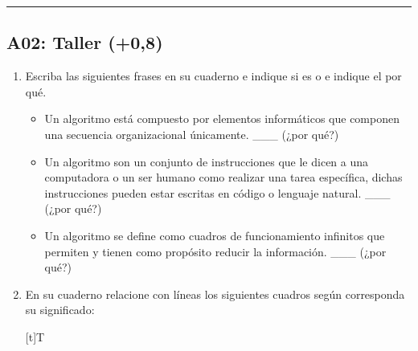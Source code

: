 \documentclass[letterpaper,10pt,spanish]{sphinxmanual}
\let\sphinxpxdimen\pdfpxdimen\else\newdimen\sphinxpxdimen
\begin{document}
\bigskip\hrule\bigskip



\subsection{A02: Taller (+0,8)}
\label{\detokenize{1_guias/10programacion/G1023:a02-taller-0-8}}
\sphinxAtStartPar
{}
\begin{enumerate}
%
\item {} 
\sphinxAtStartPar
Escriba las siguientes frases en su cuaderno e indique si es  o  e indique el por qué.
\begin{itemize}
\item {} 
\sphinxAtStartPar
Un algoritmo está compuesto por elementos informáticos que componen una secuencia organizacional únicamente. \_\_\_ (¿por qué?)

\item {} 
\sphinxAtStartPar
Un algoritmo son un conjunto de instrucciones que le dicen a una computadora o un ser humano como realizar una tarea específica, dichas instrucciones pueden estar escritas en código o lenguaje natural. \_\_\_ (¿por qué?)

\item {} 
\sphinxAtStartPar
Un algoritmo se define como cuadros de funcionamiento infinitos que permiten y tienen como propósito reducir la información. \_\_\_ (¿por qué?)

\end{itemize}

\item {} 
\sphinxAtStartPar
En su cuaderno relacione con líneas los siguientes cuadros según corresponda su significado:


\begin{savenotes}\sphinxattablestart
\sphinxthistablewithglobalstyle
\centering
\begin{tabulary}{\linewidth}[t]{T}
\sphinxtoprule
\sphinxtableatstartofbodyhook

\begin{sphinxfigure-in-table}
\centering
\capstart
\noindent\sphinxincludegraphics[width=500\sphinxpxdimen]{{image105}.png}
\label{\detokenize{1_guias/10programacion/G1023:id13}}\end{sphinxfigure-in-table}\relax
\\
\sphinxbottomrule
\end{tabulary}
\sphinxtableafterendhook\par
\sphinxattableend\end{savenotes}


\end{enumerate}
\end{document}
